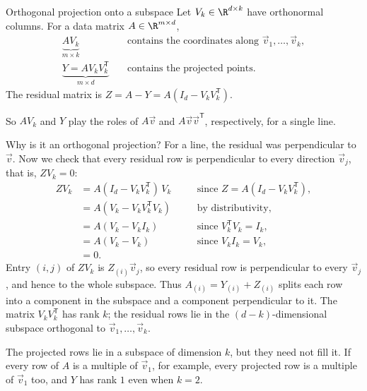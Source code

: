 \documentclass[a4paper,12pt,oneside]{report}
\begin{document}
\begin{frameddefn}{Orthogonal projection onto a subspace}
\label{def:projection-subspace}
Let $V_k\in\R^{d\times k}$ have orthonormal columns. For a data
matrix $A\in\R^{m\times d}$,
\[
\begin{aligned}
  \underbrace{AV_k}_{m\times k}
     &\quad\text{contains the coordinates along }
       \vec v_1,\ldots,\vec v_k,\\[6pt]
  \underbrace{Y=AV_kV_k^{\mathsf T}}_{m\times d}
     &\quad\text{contains the projected points}.
\end{aligned}
\]
The residual matrix is $Z=A-Y=A(I_d-V_kV_k^{\mathsf T})$.
\end{frameddefn}

So $AV_k$ and $Y$ play the roles of $A\vec v$ and
$A\vec v\vec v^{\mathsf T}$, respectively, for a single line.

Why is it an orthogonal projection? For a line, the residual was
perpendicular to $\vec v$. Now we check that every residual row is
perpendicular to every direction $\vec v_j$, that is, $ZV_k=0$:
\[
\begin{aligned}
  ZV_k&=A(I_d-V_kV_k^{\mathsf T})\,V_k
      &&\quad\text{since } Z=A(I_d-V_kV_k^{\mathsf T}),\\
    &=A(V_k-V_kV_k^{\mathsf T}V_k)
      &&\quad\text{by distributivity},\\
    &=A(V_k-V_kI_k)
      &&\quad\text{since } V_k^{\mathsf T}V_k=I_k,\\
    &=A(V_k-V_k)
      &&\quad\text{since } V_kI_k=V_k,\\
    &=0.
\end{aligned}
\]
Entry $(i,j)$ of $ZV_k$ is $Z_{(i)}\vec v_j$, so every residual row is
perpendicular to every $\vec v_j$, and hence to the whole subspace.
Thus $A_{(i)}=Y_{(i)}+Z_{(i)}$ splits each row into a component in the
subspace and a component perpendicular to it. The matrix
$V_kV_k^{\mathsf T}$ has rank $k$; the residual rows lie in the
$(d-k)$-dimensional subspace orthogonal to
$\vec v_1,\ldots,\vec v_k$.

The projected rows lie in a subspace of dimension $k$, but they need
not fill it. If every row of $A$ is a multiple of $\vec v_1$, for
example, every projected row is a multiple of $\vec v_1$ too, and $Y$
has rank $1$ even when $k=2$.
\end{document}
